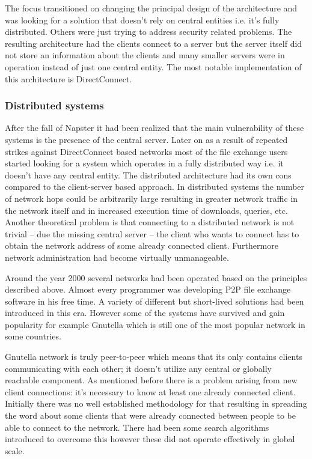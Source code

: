 \documentclass[a4paper]{article}
\begin{document}
The focus transitioned on changing the principal design of the architecture and was looking for a solution that doesn't
rely on central entities i.e. it's fully distributed. Others were just trying to address security related problems. The
resulting architecture had the clients connect to a server but the server itself did not store an information about the
clients and many smaller servers were in operation instead of just one central entity. The most notable implementation
of this architecture is DirectConnect.

\subsubsection{Distributed systems}

After the fall of Napster it had been realized that the main vulnerability of these systems is the presence of the
central server. Later on as a result of repeated strikes against DirectConnect based networks most of the file exchange
users started looking for a system which operates in a fully distributed way i.e. it doesn't have any central entity.
The distributed architecture had its own cons compared to the client-server based approach. In distributed systems the
number of network hops could be arbitrarily large resulting in greater network traffic in the network itself and in
increased execution time of downloads, queries, etc. Another theoretical problem is that connecting to a distributed
network is not trivial -- due the missing central server -- the client who wants to connect has to obtain the network
address of some already connected client. Furthermore network administration had become virtually unmanageable.

Around the year 2000 several networks had been operated based on the principles described above. Almost every
programmer was developing P2P file exchange software in his free time. A variety of different but short-lived solutions
had been introduced in this era. However some of the systems have survived and gain popularity for example Gnutella
which is still one of the most popular network in some countries.

Gnutella network is truly peer-to-peer which means that its only contains clients communicating with each other; it
doesn't utilize any central or globally reachable component. As mentioned before there is a problem arising from new
client connections: it's necessary to know at least one already connected client. Initially there was no well
established methodology for that resulting in spreading the word about some clients that were already connected between
people to be able to connect to the network. There had been some search algorithms introduced to overcome this however
these did not operate effectively in global scale.
\end{document}
